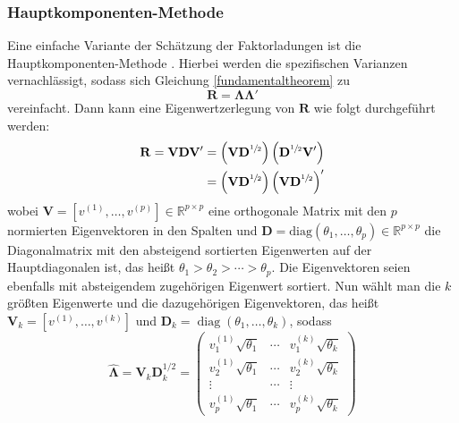 \documentclass[11pt]{scrartcl}
\DeclareMathOperator{\diag}{diag}
\begin{document}
	\subsubsection{Hauptkomponenten-Methode}
	\label{Hauptkomponenten-Methode}
	Eine einfache Variante der Schätzung der Faktorladungen ist die
	Hauptkomponenten-Methode \parencite[415-419]{Rencher.2002}. Hierbei werden die spezifischen Varianzen
	vernachlässigt, sodass sich Gleichung \ref{fundamentaltheorem} zu
	\begin{equation}
		\label{HK-Vernachlässigung-von-psi}
		\mathbf{R} = \mathbf{\Lambda} \mathbf{\Lambda}'
	\end{equation}
	vereinfacht.
	Dann kann eine Eigenwertzerlegung von $\mathbf{R}$
	wie folgt durchgeführt werden:
	\begin{equation} \label{Eigenwertzerlegung}
		\begin{split}
					\mathbf{R} = \mathbf{V D V'} &= \left( \mathbf{V} \mathbf{D}^{\sfrac{1}{2}} \right) \left( \mathbf{D}^{\sfrac{1}{2}} \mathbf{V}' \right) \\
					&= \left( \mathbf{V} \mathbf{D}^{\sfrac{1}{2}} \right) \left( \mathbf{V} \mathbf{D}^{\sfrac{1}{2}} \right)'
		\end{split}
	\end{equation} 
	wobei $\mathbf{V} = \left[ v^{(1)}, \dotsc, v^{(p)} \right] \in \mathbb{R}^{p \times p}$
	eine orthogonale Matrix mit den $p$ normierten Eigenvektoren in den Spalten und
	$\mathbf{D} = \text{diag}(\theta_1,\dotsc,\theta_p) \in \mathbb{R}^{p
		\times p}$ die Diagonalmatrix mit den absteigend sortierten Eigenwerten auf der
	Hauptdiagonalen ist, das heißt $\theta_1 > \theta_2 > \dotsb > \theta_p$. Die
	Eigenvektoren seien ebenfalls mit absteigendem zugehörigen Eigenwert
	sortiert. Nun wählt man die $k$ größten Eigenwerte und die dazugehörigen Eigenvektoren, das
	heißt $\mathbf{V}_k = [v^{(1)}, \dotsc, v^{(k)}]$ und $\mathbf{D}_k  = \diag(\theta_1, \dotsc, \theta_k)$, sodass
	\begin{equation} \label{Schätzen der Faktorladungsmatrix}
		\mathbf{\widehat{\Lambda}} = \mathbf{V}_k \mathbf{D}^{1/2}_k = \begin{pmatrix}
			v_{1}^{(1)} \sqrt{\theta_1} & \cdots & v_{1}^{(k)} \sqrt{\theta_k} \\
			v_{2}^{(1)} \sqrt{\theta_1}&\cdots & v_{2}^{(k)} \sqrt{\theta_k} \\
			\vdots                                & \cdots & \vdots  \\
			v_{p}^{(1)} \sqrt{\theta_1} & \cdots & v_{p}^{(k)} \sqrt{\theta_k} 
		\end{pmatrix}
	\end{equation}
\end{document}
